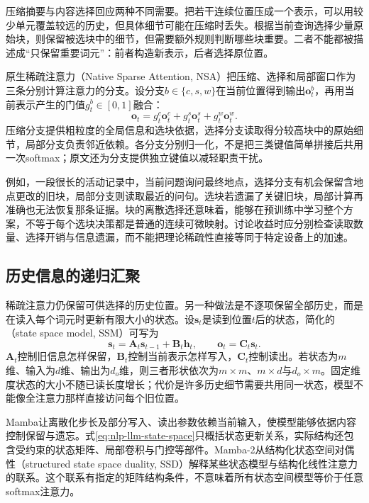压缩摘要与内容选择回应两种不同需要。把若干连续位置压成一个表示，可以用较少单元覆盖较远的历史，但具体细节可能在压缩时丢失。根据当前查询选择少量原始块，则保留被选块中的细节，但需要额外规则判断哪些块重要。二者不能都被描述成“只保留重要词元”：前者构造新表示，后者选择原位置。

原生稀疏注意力（Native Sparse Attention, NSA）把压缩、选择和局部窗口作为三条分别计算注意力的分支。设分支$b\in\{c,s,w\}$在当前位置得到输出$\bm o_t^{b}$，再用当前表示产生的门值$g_t^{b}\in[0,1]$融合：
\begin{equation}
 \bm o_t=g_t^{c}\bm o_t^{c}
             +g_t^{s}\bm o_t^{s}
             +g_t^{w}\bm o_t^{w}.
 \label{eq:nlp-llm-nsa}
\end{equation}
压缩分支提供粗粒度的全局信息和选块依据，选择分支读取得分较高块中的原始细节，局部分支负责邻近依赖。各分支分别归一化，不是把三类键值简单拼接后共用一次softmax；原文还为分支提供独立键值以减轻职责干扰。

例如，一段很长的活动记录中，当前问题询问最终地点，选择分支有机会保留含地点更改的旧块，局部分支则读取最近的问句。选块若遗漏了关键旧块，局部计算再准确也无法恢复那条证据。块的离散选择还意味着，能够在预训练中学习整个方案，不等于每个选块决策都是普通的连续可微映射。讨论收益时应分别检查读取数量、选择开销与信息遗漏，而不能把理论稀疏性直接等同于特定设备上的加速。

\subsection{历史信息的递归汇聚}
\label{sec:nlp-llm-recurrent-state}

稀疏注意力仍保留可供选择的历史位置。另一种做法是不逐项保留全部历史，而是在读入每个词元时更新有限大小的状态。设$\bm s_t$是读到位置$t$后的状态，简化的（state space model, SSM）可写为
\begin{equation}
 \bm s_t=\bm A_t\bm s_{t-1}+\bm B_t\bm h_t,
 \qquad
 \bm o_t=\bm C_t\bm s_t.
 \label{eq:nlp-llm-state-space}
\end{equation}
$\bm A_t$控制旧信息怎样保留，$\bm B_t$控制当前表示怎样写入，$\bm C_t$控制读出。若状态为$m$维、输入为$d$维、输出为$d_o$维，则三者形状依次为$m\times m$、$m\times d$与$d_o\times m$。固定维度状态的大小不随已读长度增长；代价是许多历史细节需要共用同一状态，模型不能像全注意力那样直接访问每个旧位置。

Mamba让离散化步长及部分写入、读出参数依赖当前输入，使模型能够依据内容控制保留与遗忘。式\eqref{eq:nlp-llm-state-space}只概括状态更新关系，实际结构还包含受约束的状态矩阵、局部卷积与门控等部件。Mamba-2从结构化状态空间对偶性（structured state space duality, SSD）解释某些状态模型与结构化线性注意力的联系。这个联系有指定的矩阵结构条件，不意味着所有状态空间模型等价于任意softmax注意力。

